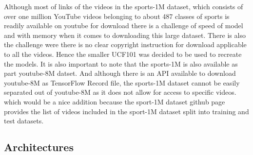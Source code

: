 \documentclass[10pt,phd,a4paper,oneside]{article}
\begin{document}
    Although most of links of the videos in the sports-1M dataset, which consists of over one million YouTube videos belonging to about 487 classes of sports is readily available on youtube for download there is a challenge of speed of model and with memory when it comes to downloading this large dataset. There is also the challenge were there is no clear copyright instruction for download applicable to all the videos. Hence the smaller UCF101 was decided to be used to recreate the models. It is also important to note that the sports-1M is also available as part youtube-8M datset. And although there is an API available to download youtube-8M as TensorFlow Record file, the sports-1M dataset cannot be easily  separated out of youtube-8M as it does not allow for access to specific videos. which would be a nice addition because the sport-1M dataset github page provides the list of videos included in the sport-1M dataset split into training and test datasets.



    \subsection{Architectures}
\end{document}
